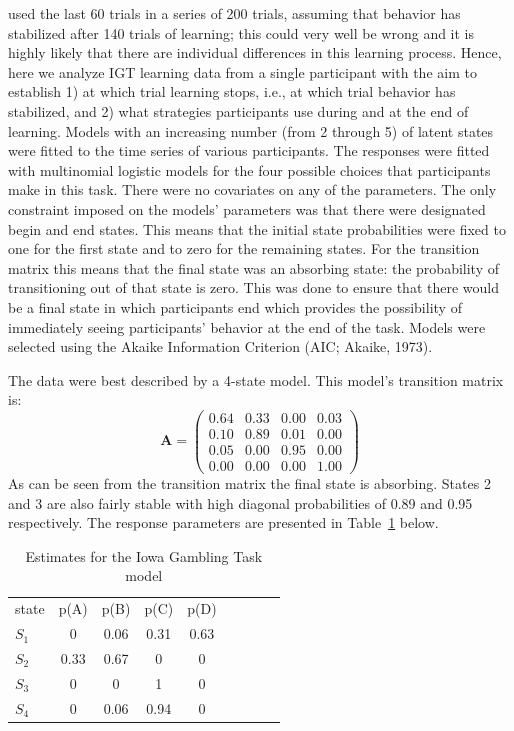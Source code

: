 \documentclass[a4paper,12pt,man]{apa} %
\newcommand{\citet}{\citeA}
\newcommand{\mat}{\mathbf}
\begin{document}
\citet{Huizenga2007b} used the last 60 trials in a series of 200
trials, assuming that behavior has stabilized after 140 trials of
learning; this could very well be wrong and it is highly likely that
there are individual differences in this learning process.  Hence,
here we analyze IGT learning data from a single participant with the
aim to establish 1) at which trial learning stops, i.e., at which
trial behavior has stabilized, and 2) what strategies participants use
during and at the end of learning.  Models with an increasing number
(from 2 through 5) of latent states were fitted to the time series of
various participants.  The responses were fitted with multinomial
logistic models for the four possible choices that participants make in
this task.  There were no covariates on any of the parameters.  The
only constraint imposed on the models' parameters was that there were
designated begin and end states.  This means that the initial state
probabilities were fixed to one for the first state and to zero for
the remaining states.  For the transition matrix this means that the
final state was an absorbing state: the probability of transitioning
out of that state is zero.  This was done to ensure that there would
be a final state in which participants end which provides the
possibility of immediately seeing participants' behavior at the end of
the task.  Models were selected using the Akaike Information Criterion
(AIC; Akaike, 1973).

\nocite{Akaike1973} %

The data were best described by a 4-state model.  This model's
transition matrix is:
$$
\mat{A} = \begin{pmatrix} 
				0.64 & 0.33 & 0.00 & 0.03 \\
				0.10 & 0.89 & 0.01 & 0.00 \\
				0.05 & 0.00 & 0.95 & 0.00 \\
				0.00 & 0.00 & 0.00 & 1.00
		  \end{pmatrix}
$$
As can be seen from the transition matrix the final state is
absorbing.  States 2 and 3 are also fairly stable with high diagonal
probabilities of 0.89 and 0.95 respectively.  The response parameters
are presented in Table~\ref{tab:igt4} below.


\begin{table}
	\caption{Estimates for the Iowa Gambling Task model}
	\label{tab:igt4}
	\begin{tabular}{lcccccccc} \hline
		state & p(A) & p(B) & p(C) & p(D) \\
		$S_1$ & 0    & 0.06 & 0.31 & 0.63 \\
		$S_2$ & 0.33 & 0.67 & 0    & 0 \\ 
		$S_3$ & 0    & 0    & 1    & 0 \\
		$S_4$ & 0    & 0.06 & 0.94 & 0 
	\end{tabular}
\end{table}
\end{document}
